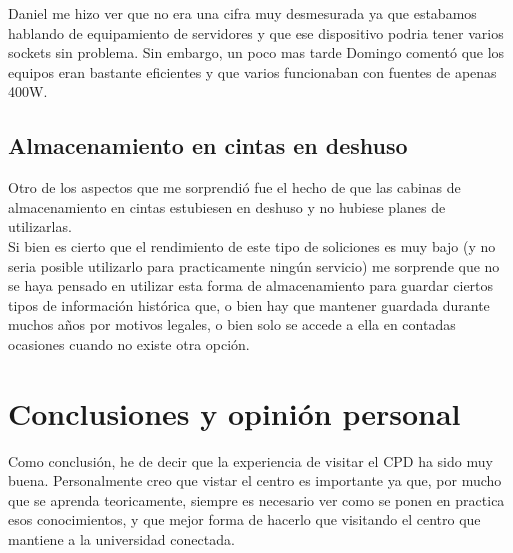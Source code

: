 \documentclass[a4paper,11pt]{article}
\begin{document}
Daniel me hizo ver que no era una cifra muy desmesurada ya que estabamos hablando de equipamiento de servidores y que ese dispositivo podria tener varios sockets sin problema. Sin embargo, un poco mas tarde Domingo comentó que los equipos eran bastante eficientes y que varios funcionaban con fuentes de apenas 400W.

\subsection{Almacenamiento en cintas en deshuso}
Otro de los aspectos que me sorprendió fue el hecho de que las cabinas de almacenamiento en cintas estubiesen en deshuso y no hubiese planes de utilizarlas.\\

Si bien es cierto que el rendimiento de este tipo de soliciones es muy bajo (y no seria posible utilizarlo para practicamente ningún servicio) me sorprende que no se haya pensado en utilizar esta forma de almacenamiento para guardar ciertos tipos de información histórica que, o bien hay que mantener guardada durante muchos años por motivos legales, o bien solo se accede a ella en contadas ocasiones cuando no existe otra opción.

\section{Conclusiones y opinión personal}
Como conclusión, he de decir que la experiencia de visitar el CPD ha sido muy buena. Personalmente creo que vistar el centro es importante ya que, por mucho que se aprenda teoricamente, siempre es necesario ver como se ponen en practica esos conocimientos, y que mejor forma de hacerlo que visitando el centro que mantiene a la universidad conectada.\\
\end{document}
